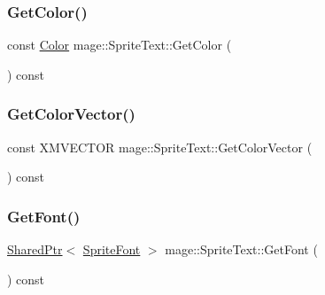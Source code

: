 \subsubsection{\texorpdfstring{Get\+Color()}{GetColor()}}
{\footnotesize\ttfamily const \hyperlink{structmage_1_1_color}{Color} mage\+::\+Sprite\+Text\+::\+Get\+Color (\begin{DoxyParamCaption}{ }\end{DoxyParamCaption}) const}

\hypertarget{classmage_1_1_sprite_text_af1132df7faed07b44ae6415ae51b6318}{}\label{classmage_1_1_sprite_text_af1132df7faed07b44ae6415ae51b6318} 
\subsubsection{\texorpdfstring{Get\+Color\+Vector()}{GetColorVector()}}
{\footnotesize\ttfamily const X\+M\+V\+E\+C\+T\+OR mage\+::\+Sprite\+Text\+::\+Get\+Color\+Vector (\begin{DoxyParamCaption}{ }\end{DoxyParamCaption}) const\hspace{0.3cm}{\ttfamily [protected]}}

\hypertarget{classmage_1_1_sprite_text_a1c80933525f87fe4dced9479c1b79764}{}\label{classmage_1_1_sprite_text_a1c80933525f87fe4dced9479c1b79764} 
\subsubsection{\texorpdfstring{Get\+Font()}{GetFont()}}
{\footnotesize\ttfamily \hyperlink{namespacemage_a1e01ae66713838a7a67d30e44c67703e}{Shared\+Ptr}$<$ \hyperlink{classmage_1_1_sprite_font}{Sprite\+Font} $>$ mage\+::\+Sprite\+Text\+::\+Get\+Font (\begin{DoxyParamCaption}{ }\end{DoxyParamCaption}) const}

\hypertarget{classmage_1_1_sprite_text_ab9f289c7c70988da6acf031108ad4934}{}\label{classmage_1_1_sprite_text_ab9f289c7c70988da6acf031108ad4934} 
